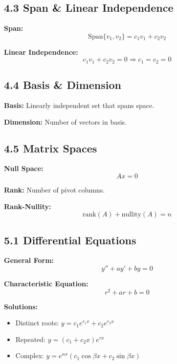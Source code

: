 \documentclass[10pt]{article}
\begin{document}
\subsection*{4.3 Span \& Linear Independence}
\textbf{Span:}
\[
\text{Span}\{v_1, v_2\} = c_1 v_1 + c_2 v_2
\]

\textbf{Linear Independence:}
\[
c_1 v_1 + c_2 v_2 = 0 \Rightarrow c_1 = c_2 = 0
\]

\subsection*{4.4 Basis \& Dimension}
\textbf{Basis:}
Linearly independent set that spans space.

\textbf{Dimension:}
Number of vectors in basis.

\subsection*{4.5 Matrix Spaces}
\textbf{Null Space:}
\[
Ax = 0
\]

\textbf{Rank:}
Number of pivot columns.

\textbf{Rank-Nullity:}
\[
\text{rank}(A) + \text{nullity}(A) = n
\]

\subsection*{5.1 Differential Equations}
\textbf{General Form:}
\[
y'' + ay' + by = 0
\]

\textbf{Characteristic Equation:}
\[
r^2 + ar + b = 0
\]

\textbf{Solutions:}
\begin{itemize}
\item Distinct roots: $y = c_1 e^{r_1 x} + c_2 e^{r_2 x}$
\item Repeated: $y = (c_1 + c_2 x)e^{rx}$
\item Complex: $y = e^{\alpha x}(c_1 \cos \beta x + c_2 \sin \beta x)$
\end{itemize}
\end{document}
